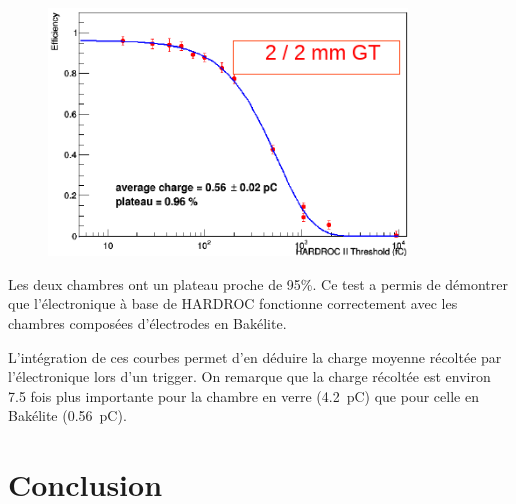 \begin{figure}[ht!]
	\centering
	\includegraphics[width=0.85\textwidth]{GLA/effithrbak.png}
	\label{effithrbak}
\end{figure}

Les deux chambres ont un plateau proche de \num{95}\%. Ce test a permis de démontrer que l'électronique à base de HARDROC fonctionne correctement avec les chambres composées d'électrodes en Bakélite.

L'intégration de ces courbes permet d'en déduire la charge moyenne récoltée par l'électronique lors d'un trigger. On remarque que la charge récoltée est environ \num{7.5} fois plus importante pour la chambre en verre (\SI{4.2}{\pico\coulomb}) que pour celle en Bakélite (\SI{0.56}{\pico\coulomb}).

\section{Conclusion}

